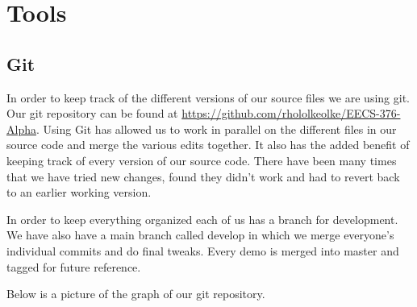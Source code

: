 \section{Tools}

\subsection{Git}

In order to keep track of the different versions of our source files
we are using git.  Our git repository can be found at
\url{https://github.com/rhololkeolke/EECS-376-Alpha}.  Using Git has
allowed us to work in parallel on the different files in our source
code and merge the various edits together.  It also has the added
benefit of keeping track of every version of our source code. There
have been many times that we have tried new changes, found they didn't
work and had to revert back to an earlier working version.

In order to keep everything organized each of us has a branch for
development.  We have also have a main branch called develop in which
we merge everyone's individual commits and do final tweaks. Every
demo is merged into master and tagged for future reference.

Below is a picture of the graph of our git repository.

